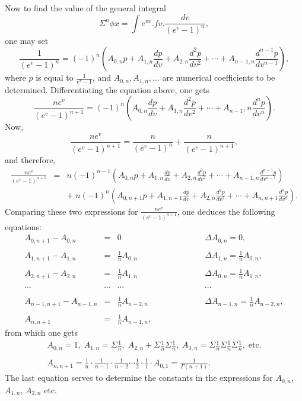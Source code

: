 \documentclass[12pt]{article}
\begin{document}
Now to find the value of the general integral 
\[ \Sigma^n\phi x = \int e^{vx} . fv . \frac{dv}{\left(e^v-1\right)^n}, \]
one may set 
\[ \frac{1}{\left(e^v - 1\right)^n} = (-1)^n\left( A_{0,n} p + A_{1,n} \frac{dp}{dv} + A_{2,n} \frac{d^2p}{dv^2} + \cdots + A_{n-1,n} \frac{d^{n-1}p}{dv^{n-1}} \right), \]
where $p$ is equal to $\frac{1}{e^v-1}$, and $A_{0,n}, A_{1,n}, \dots$ are numerical coefficients to be determined.  Differentiating the equation above, one gets
\[ \frac{ne^v}{\left(e^v-1\right)^{n+1}} = (-1)^n \left(A_{0,n} \frac{dp}{dv} + A_{1,n} \frac{d^2p}{dv^2} + \cdots + A_{n-1},n \frac{d^np}{dv^n} \right). \]
Now,
\[ \frac{ne^v}{\left(e^v-1\right)^{n+1}} = \frac{n}{\left(e^v-1\right)^n} + \frac{n}{\left(e^v-1\right)^{n+1}} , \]
and therefore, 
\begin{eqnarray*} \frac{ne^v}{\left( e^v -1\right)^{n+1}} &=& n (-1)^{n-1}\left( A_{0,n} p + A_{1,n} \frac{dp}{dv} + A_{2,n} \frac{d^2p}{dv^2} + \cdots + A_{n-1,n} \frac{d^{n-1}p}{dv^{n-1}} \right) \\
&  &+  \; n(-1)^n\left( A_{0,n+1} p + A_{1,n+1} \frac{dp}{dv} + A_{2,n} \frac{d^2p}{dv^2} + \cdots + A_{n,n+1} \frac{d^n p}{dv^n} \right) . \end{eqnarray*}
Comparing these two expressions for $\frac{ne^v}{\left(e^v-1\right)^{n+1}}$, one deduces the following equations:
\[ \begin{array}{rclcrcl} A_{0,n+1} - A_{0,n} &=& 0 & \hspace{2cm} & \Delta A_{0,n} = 0 , \\ \\
A_{1,n+1} - A_{1,n} &=& \frac{1}{n} A_{0,n} &  & \Delta A_{1,n} = \frac{1}{n}A_{0,n} , \\ \\
A_{2,n+1} - A_{2,n} &=& \frac{1}{n}A_{1,n} &  & \Delta A_{0,n} = \frac{1}{n} A_{1,n} , \\ \\
\cdots & \cdots & \cdots & & \cdots\\ \\
A_{n-1,n+1} - A_{n-1,n} &=& \frac{1}{n}A_{n-2,n} &  & \Delta A_{n-1,n} = \frac{1}{n} A_{n-2,n} , \\ \\
A_{n,n+1} &=& \frac{1}{n}A_{n-1,n}, & & \end{array} \]
from which one gets
\[ \begin{array}{c} A_{0,n} = 1, \; A_{1,n} = \Sigma \frac{1}{n}, \; A_{2,n} + \Sigma \frac{1}{n} \Sigma \frac{1}{n}, \; A_{3,n} = \Sigma \frac{1}{n} \Sigma \frac{1}{n} \Sigma \frac{1}{n}, \; \mathrm{etc.} \\ \\
A_{n,n+1} = \frac{1}{n} \cdot \frac{1}{n-1} \cdot \frac{1}{n-2} \cdots \frac{1}{2} \cdot \frac{1}{1} \cdot A_{0,1} = \frac{1}{\Gamma(n +1)} . \end{array} \]
The last equation serves to determine the constants in the expressions for $A_{0,n}$, $A_{1,n}$, $A_{2,n}$ etc.
\end{document}
